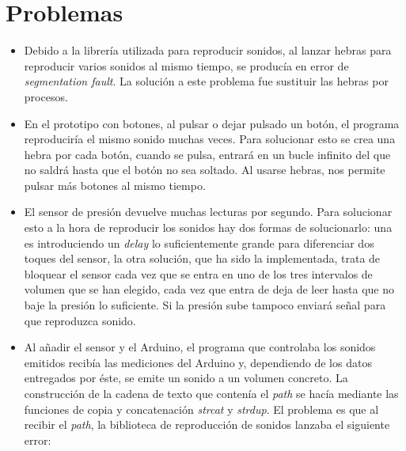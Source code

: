     \section{Problemas} %
    \label{sec:Problemas}

        \begin{itemize}
            \item
            Debido a la librería utilizada para reproducir sonidos, al lanzar hebras para reproducir varios sonidos al
            mismo tiempo, se producía en error de \textit{segmentation fault}. La solución a este problema fue sustituir
            las hebras por procesos.
            \item
            En el prototipo con botones, al pulsar o dejar pulsado un botón, el programa reproduciría el mismo
            sonido muchas veces. Para solucionar esto se crea una hebra por cada botón, cuando se pulsa, entrará
            en un bucle infinito del que no saldrá hasta que el botón no sea soltado. Al usarse hebras, nos
            permite pulsar más botones al mismo tiempo.
            \item
            El sensor de presión devuelve muchas lecturas por segundo. Para solucionar esto a la hora de reproducir los
            sonidos hay dos formas de solucionarlo: una es introduciendo un \textit{delay} lo suficientemente grande
            para diferenciar dos toques del sensor, la otra solución, que ha sido la implementada, trata de bloquear el
            sensor cada vez que se entra en uno de los tres intervalos de volumen que se han elegido, cada vez que entra
            de deja de leer hasta que no baje la presión lo suficiente. Si la presión sube tampoco enviará señal para
            que reproduzca sonido.
            \item
            Al añadir el sensor y el Arduino, el programa que controlaba los sonidos emitidos recibía las mediciones
            del Arduino y, dependiendo de los datos entregados por éste, se emite un sonido a un volumen concreto.
            La construcción de la cadena de texto que contenía el \textit{path} se hacía mediante las funciones de
            copia y concatenación \textit{strcat} y \textit{strdup}. El problema es que al recibir el \textit{path},
            la biblioteca de reproducción de sonidos lanzaba el siguiente error:


\end{itemize}
